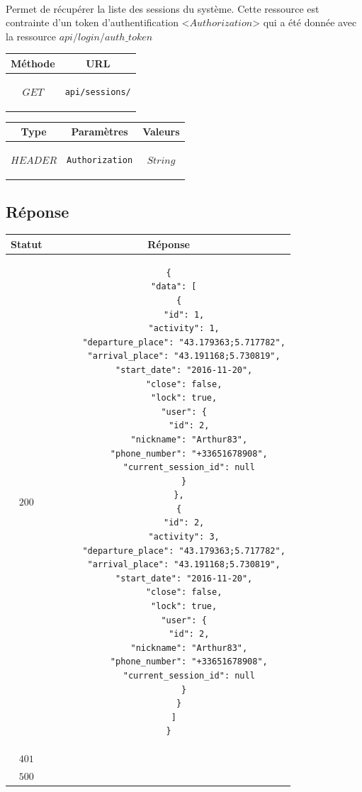 \documentclass[titlepage, 12pt]{report}
\begin{document}
\paragraph{} Permet de récupérer la liste des sessions du système. Cette ressource est contrainte d'un token d'authentification <$Authorization$> qui a été donnée avec la ressource $api/login/auth\_token$

\begin{center}
	\begin{tabular}{|c|c|}
	\hline
	Méthode & URL \\
	\hline
	$ GET $ 
	&
	\begin{lstlisting}
api/sessions/
	\end{lstlisting} 
	\\ \hline
	\end{tabular}
\end{center}


\begin{center}
	\begin{tabular}{|c|c|c|}
	\hline
	Type & Paramètres & Valeurs \\
	\hline
	$ HEADER $ & 
	\begin{lstlisting}
Authorization
	\end{lstlisting} &
	$ String $ \\ \hline
	
	\end{tabular}
\end{center}

\subsection{Réponse}

\begin{center}
	\begin{tabular}{|c|c|}
		\hline
		Statut & Réponse \\
		\hline
		$ 200 $ & \begin{lstlisting}
{
  "data": [
    {
      "id": 1,
      "activity": 1,
      "departure_place": "43.179363;5.717782",
      "arrival_place": "43.191168;5.730819",
      "start_date": "2016-11-20",
      "close": false,
      "lock": true,
      "user": {
        "id": 2,
        "nickname": "Arthur83",
        "phone_number": "+33651678908",
        "current_session_id": null
      }
    },
    {
      "id": 2,
      "activity": 3,
      "departure_place": "43.179363;5.717782",
      "arrival_place": "43.191168;5.730819",
      "start_date": "2016-11-20",
      "close": false,
      "lock": true,
      "user": {
        "id": 2,
        "nickname": "Arthur83",
        "phone_number": "+33651678908",
        "current_session_id": null
      }
    }
  ]
}
		\end{lstlisting} \\ 
		\hline
		$ 401 $ & \\
		\hline
		$ 500 $ & \\
		\hline
	\end{tabular}
\end{center}
\end{document}
